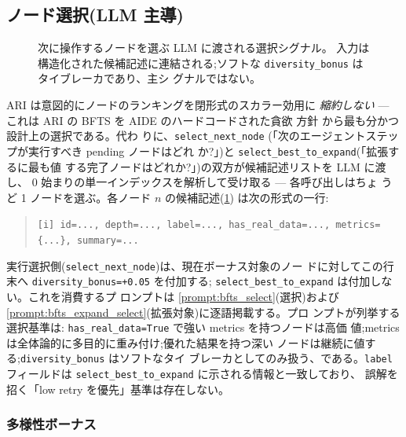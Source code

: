 \subsection{ノード選択(LLM 主導)}\label{sec:exploration:node-selection}

\begin{figure}[t]
  \centering
  \resizebox{\columnwidth}{!}{}
  \caption{次に操作するノードを選ぶ LLM に渡される選択シグナル。
           入力は構造化された候補記述に連結される;ソフトな
           \texttt{diversity\_bonus} はタイブレーカであり、主シ
           グナルではない。}
  \label{fig:nodescore}
\end{figure}

ARI は意図的にノードのランキングを閉形式のスカラー効用に\emph{
縮約しない} — これは ARI の BFTS を AIDE のハードコードされた貪欲
方針 \cite{jiang2025aide} から最も分かつ設計上の選択である。代わ
りに、\texttt{select\_next\_node}
(「次のエージェントステップが実行すべき pending ノードはどれ
か?」)と \texttt{select\_best\_to\_expand}(「拡張するに最も値
する完了ノードはどれか?」)の双方が候補記述リストを LLM に渡し、
0 始まりの単一インデックスを解析して受け取る — 各呼び出しはちょ
うど 1 ノードを選ぶ。各ノード $n$ の候補記述(\cref{fig:nodescore})
は次の形式の一行:
\begin{quote}\small\texttt{[i] id=..., depth=..., label=..., has\_real\_data=..., metrics=\{...\}, summary=...}\end{quote}
実行選択側(\texttt{select\_next\_node})は、現在ボーナス対象のノー
ドに対してこの行末へ \texttt{diversity\_bonus=+0.05} を付加する;
\texttt{select\_best\_to\_expand} は付加しない。これを消費するプ
ロンプトは \cref{prompt:bfts_select}(選択)および
\cref{prompt:bfts_expand_select}(拡張対象)に逐語掲載する。プロ
ンプトが列挙する選択基準は:
\texttt{has\_real\_data=True} で強い metrics を持つノードは高価
値;metrics は全体論的に多目的に重み付け;優れた結果を持つ深い
ノードは継続に値する;\texttt{diversity\_bonus} はソフトなタイ
ブレーカとしてのみ扱う、である。\texttt{label} フィールドは
\texttt{select\_best\_to\_expand} に示される情報と一致しており、
誤解を招く「low retry を優先」基準は存在しない。

\subsubsection*{多様性ボーナス}\label{sec:exploration:diversity}

